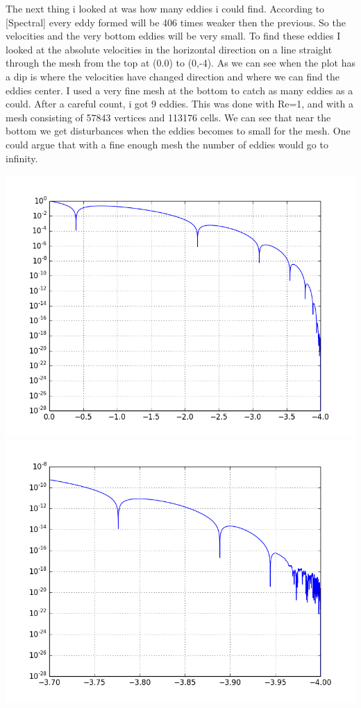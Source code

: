 \documentclass[a4paper,norsk]{article}
\begin{document}
\newline
\newline
The next thing i looked at was how many eddies i could find. According to [Spectral] every eddy formed will be 406 times weaker then the previous. So the velocities and the very bottom eddies will be very small. To find these eddies I looked at the absolute velocities in the horizontal direction on a line straight through the mesh from the top at (0.0) to (0,-4). As we can see when the plot has a dip is where the velocities have changed direction and where we can find the eddies center. I used a very fine mesh at the bottom to catch as many eddies as a could. After a careful count, i got 9 eddies. This was done with Re=1, and with a mesh consisting of 57843 vertices and 113176 cells.\newline
We can see that near the bottom we get disturbances when the eddies becomes to small for the mesh. One could argue that with a fine enough mesh the number of eddies would go to infinity.

\includegraphics[trim = 0mm 0mm 0mm 0mm, clip, scale=0.4]{eddy_plot_1.png}
\includegraphics[trim = 0mm 0mm 0mm 0mm, clip, scale=0.4]{eddy_plot_2.png}
\end{document}
